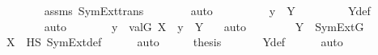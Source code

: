 \begin{isabellebody}
\ \ \ \ \ \ \isamarkupfalse%
\ assms\ SymExt{\isacharunderscore}{\kern0pt}trans\isanewline
\ \ \ \ \ \ \isamarkupfalse%
\ auto\isanewline
\ \ \ \ \isamarkupfalse%
\ \isamarkupfalse%
\ {\isachardoublequoteopen}{\isachardot}{\kern0pt}{\isachardot}{\kern0pt}{\isachardot}{\kern0pt}\ {\isasymlongleftrightarrow}\ y\ {\isasymin}\ Y{\isachardoublequoteclose}\ \isanewline
\ \ \ \ \ \ \isamarkupfalse%
\ Y{\isacharunderscore}{\kern0pt}def\ \isanewline
\ \ \ \ \ \ \isamarkupfalse%
\ auto\isanewline
\ \ \ \ \isamarkupfalse%
\ \isamarkupfalse%
\ {\isachardoublequoteopen}y\ {\isasymin}\ val{\isacharparenleft}{\kern0pt}G{\isacharcomma}{\kern0pt}\ X{\isacharparenright}{\kern0pt}\ {\isasymlongleftrightarrow}\ y\ {\isasymin}\ Y\ {\isachardoublequoteclose}\ \isamarkupfalse%
\ auto\isanewline
\ \ \isamarkupfalse%
\isanewline
\isanewline
\ \ \isamarkupfalse%
\ \isamarkupfalse%
\ {\isachardoublequoteopen}Y\ {\isasymin}\ SymExt{\isacharparenleft}{\kern0pt}G{\isacharparenright}{\kern0pt}{\isachardoublequoteclose}\ \isanewline
\ \ \ \ \isamarkupfalse%
\ {\isacartoucheopen}X\ {\isasymin}\ HS{\isacartoucheclose}\ SymExt{\isacharunderscore}{\kern0pt}def\isanewline
\ \ \ \ \isamarkupfalse%
\ auto\isanewline
\ \ \isamarkupfalse%
\ \isamarkupfalse%
\ {\isacharquery}{\kern0pt}thesis\ \isanewline
\ \ \ \ \isamarkupfalse%
\ Y{\isacharunderscore}{\kern0pt}def\isanewline
\ \ \ \ \isamarkupfalse%
\ auto\isanewline
{}\isamarkupfalse%
%
\endisatagproof
{\isafoldproof}%
%
\isadelimproof
\isanewline
%
\endisadelimproof
\isanewline
{}\isamarkupfalse%
\isanewline
%
\isadelimtheory
%
\endisadelimtheory
%
\isatagtheory
{}\isamarkupfalse%
%
\endisatagtheory
{\isafoldtheory}%
%
\isadelimtheory
%
\endisadelimtheory
%
\end{isabellebody}%
\endinput
